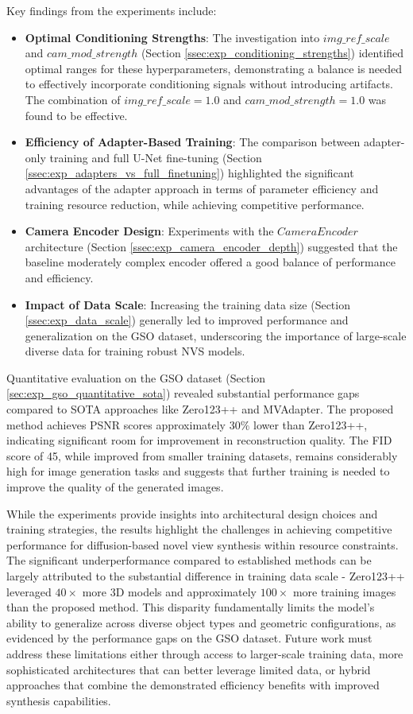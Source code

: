 Key findings from the experiments include:
\begin{itemize}
  \item \textbf{Optimal Conditioning Strengths}: The investigation into $img\_ref\_scale$ and $cam\_mod\_strength$ (Section \ref{ssec:exp_conditioning_strengths}) identified optimal ranges for these hyperparameters, demonstrating a balance is needed to effectively incorporate conditioning signals without introducing artifacts. The combination of $img\_ref\_scale=1.0$ and $cam\_mod\_strength=1.0$ was found to be effective.
  \item \textbf{Efficiency of Adapter-Based Training}: The comparison between adapter-only training and full U-Net fine-tuning (Section \ref{ssec:exp_adapters_vs_full_finetuning}) highlighted the significant advantages of the adapter approach in terms of parameter efficiency and training resource reduction, while achieving competitive performance.
  \item \textbf{Camera Encoder Design}: Experiments with the $CameraEncoder$ architecture (Section \ref{ssec:exp_camera_encoder_depth}) suggested that the baseline moderately complex encoder offered a good balance of performance and efficiency.
  \item \textbf{Impact of Data Scale}: Increasing the training data size (Section \ref{ssec:exp_data_scale}) generally led to improved performance and generalization on the GSO dataset, underscoring the importance of large-scale diverse data for training robust NVS models.
\end{itemize}

Quantitative evaluation on the GSO dataset (Section \ref{sec:exp_gso_quantitative_sota}) revealed substantial performance gaps compared to SOTA approaches like Zero123++ and MVAdapter. The proposed method achieves PSNR scores approximately $30\%$ lower than Zero123++, indicating significant room for improvement in reconstruction quality. The FID score of 45, while improved from smaller training datasets, remains considerably high for image generation tasks and suggests that further training is needed to improve the quality of the generated images.

While the experiments provide insights into architectural design choices and training strategies, the results highlight the challenges in achieving competitive performance for diffusion-based novel view synthesis within resource constraints. The significant underperformance compared to established methods can be largely attributed to the substantial difference in training data scale - Zero123++ leveraged $40\times$ more 3D models and approximately $100\times$ more training images than the proposed method. This disparity fundamentally limits the model's ability to generalize across diverse object types and geometric configurations, as evidenced by the performance gaps on the GSO dataset. Future work must address these limitations either through access to larger-scale training data, more sophisticated architectures that can better leverage limited data, or hybrid approaches that combine the demonstrated efficiency benefits with improved synthesis capabilities.